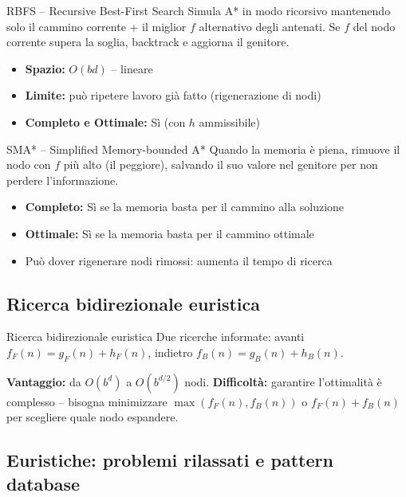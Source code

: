 \documentclass[12pt,a4paper]{article}
\begin{document}
\begin{thmbox}{RBFS -- Recursive Best-First Search}
Simula A* in modo ricorsivo mantenendo solo il cammino corrente + il miglior $f$ alternativo degli antenati. Se $f$ del nodo corrente supera la soglia, backtrack e aggiorna il genitore.
\begin{itemize}[noitemsep]
  \item \textbf{Spazio:} $O(bd)$ -- lineare
  \item \textbf{Limite:} può ripetere lavoro già fatto (rigenerazione di nodi)
  \item \textbf{Completo e Ottimale:} Sì (con $h$ ammissibile)
\end{itemize}
\end{thmbox}

\begin{thmbox}{SMA* -- Simplified Memory-bounded A*}
Quando la memoria è piena, rimuove il nodo con $f$ più alto (il peggiore), salvando il suo valore nel genitore per non perdere l'informazione.
\begin{itemize}[noitemsep]
  \item \textbf{Completo:} Sì se la memoria basta per il cammino alla soluzione
  \item \textbf{Ottimale:} Sì se la memoria basta per il cammino ottimale
  \item Può dover rigenerare nodi rimossi: aumenta il tempo di ricerca
\end{itemize}
\end{thmbox}

\subsection{Ricerca bidirezionale euristica}

\begin{defbox}{Ricerca bidirezionale euristica}
Due ricerche informate: avanti $f_F(n) = g_F(n) + h_F(n)$, indietro $f_B(n) = g_B(n) + h_B(n)$.

\textbf{Vantaggio:} da $O(b^d)$ a $O(b^{d/2})$ nodi. \textbf{Difficoltà:} garantire l'ottimalità è complesso -- bisogna minimizzare $\max(f_F(n), f_B(n))$ o $f_F(n) + f_B(n)$ per scegliere quale nodo espandere.
\end{defbox}

\subsection{Euristiche: problemi rilassati e pattern database}
\end{document}
